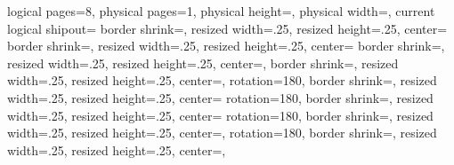 {%
  \edef\pgfpageoptionheight{\the\paperwidth}
  \edef\pgfpageoptionwidth{\the\paperheight}
  \def\pgfpageoptionborder{0pt}
  \def\pgfpageoptionfirstshipout{1}
}%
{%
  \pgfpagesphysicalpageoptions
  {%
    logical pages=8,%
    physical pages=1,%
    physical height=\pgfpageoptionheight,%
    physical width=\pgfpageoptionwidth,%
    current logical shipout=\pgfpageoptionfirstshipout%
  }
  {%
      border shrink=\pgfpageoptionborder,%
      resized width=.25\pgfphysicalwidth,%
      resized height=.25\pgfphysicalheight,%
      center=\pgfpoint{.125\pgfphysicalwidth}{.25\pgfphysicalheight}%
    }%
  {%
      border shrink=\pgfpageoptionborder,%
      resized width=.25\pgfphysicalwidth,%
      resized height=.25\pgfphysicalheight,%
      center=\pgfpoint{.375\pgfphysicalwidth}{.25\pgfphysicalheight}%
    }%
    {%
      border shrink=\pgfpageoptionborder,%
      resized width=.25\pgfphysicalwidth,%
      resized height=.25\pgfphysicalheight,%
      center=\pgfpoint{.625\pgfphysicalwidth}{.25\pgfphysicalheight},%
    }%
    {%
      border shrink=\pgfpageoptionborder,%
      resized width=.25\pgfphysicalwidth,%
      resized height=.25\pgfphysicalheight,%
      center=\pgfpoint{.875\pgfphysicalwidth}{.25\pgfphysicalheight},%
    }%
    {%
      rotation=180,
      border shrink=\pgfpageoptionborder,%
      resized width=.25\pgfphysicalwidth,%
      resized height=.25\pgfphysicalheight,%
      center=\pgfpoint{.125\pgfphysicalwidth}{.75\pgfphysicalheight}%
    }%
  {%
      rotation=180,
      border shrink=\pgfpageoptionborder,%
      resized width=.25\pgfphysicalwidth,%
      resized height=.25\pgfphysicalheight,%
      center=\pgfpoint{.375\pgfphysicalwidth}{.75\pgfphysicalheight}%
    }%
    {%
      rotation=180,
      border shrink=\pgfpageoptionborder,%
      resized width=.25\pgfphysicalwidth,%
      resized height=.25\pgfphysicalheight,%
      center=\pgfpoint{.625\pgfphysicalwidth}{.75\pgfphysicalheight},%
    }%
    {%
      rotation=180,
      border shrink=\pgfpageoptionborder,%
      resized width=.25\pgfphysicalwidth,%
      resized height=.25\pgfphysicalheight,%
      center=\pgfpoint{.875\pgfphysicalwidth}{.75\pgfphysicalheight},%
    }%
}

